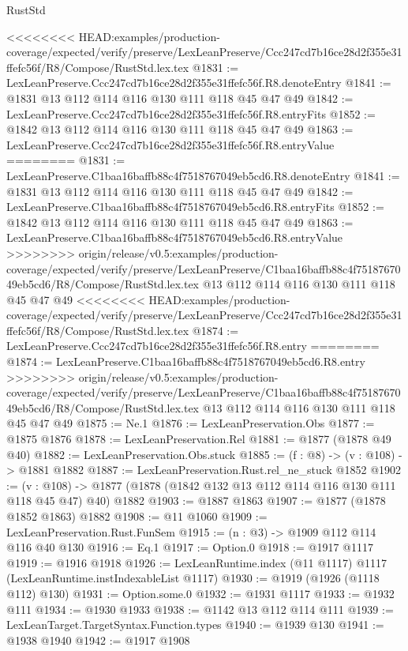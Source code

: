 \begin{lexlean}{RustStd}
\begin{coremodule}
{\begin{coremodule}
<<<<<<<< HEAD:examples/production-coverage/expected/verify/preserve/LexLeanPreserve/Ccc247cd7b16ce28d2f355e31ffefc56f/R8/Compose/RustStd.lex.tex
@1831 := LexLeanPreserve.Ccc247cd7b16ce28d2f355e31ffefc56f.R8.denoteEntry
@1841 := @1831 @13 @112 @114 @116 @130 @111 @118 @45 @47 @49
@1842 := LexLeanPreserve.Ccc247cd7b16ce28d2f355e31ffefc56f.R8.entryFits
@1852 := @1842 @13 @112 @114 @116 @130 @111 @118 @45 @47 @49
@1863 := LexLeanPreserve.Ccc247cd7b16ce28d2f355e31ffefc56f.R8.entryValue
========
@1831 := LexLeanPreserve.C1baa16baffb88c4f7518767049eb5cd6.R8.denoteEntry
@1841 := @1831 @13 @112 @114 @116 @130 @111 @118 @45 @47 @49
@1842 := LexLeanPreserve.C1baa16baffb88c4f7518767049eb5cd6.R8.entryFits
@1852 := @1842 @13 @112 @114 @116 @130 @111 @118 @45 @47 @49
@1863 := LexLeanPreserve.C1baa16baffb88c4f7518767049eb5cd6.R8.entryValue
>>>>>>>> origin/release/v0.5:examples/production-coverage/expected/verify/preserve/LexLeanPreserve/C1baa16baffb88c4f7518767049eb5cd6/R8/Compose/RustStd.lex.tex
    @13
    @112
    @114
    @116
    @130
    @111
    @118
    @45
    @47
    @49
<<<<<<<< HEAD:examples/production-coverage/expected/verify/preserve/LexLeanPreserve/Ccc247cd7b16ce28d2f355e31ffefc56f/R8/Compose/RustStd.lex.tex
@1874 := LexLeanPreserve.Ccc247cd7b16ce28d2f355e31ffefc56f.R8.entry
========
@1874 := LexLeanPreserve.C1baa16baffb88c4f7518767049eb5cd6.R8.entry
>>>>>>>> origin/release/v0.5:examples/production-coverage/expected/verify/preserve/LexLeanPreserve/C1baa16baffb88c4f7518767049eb5cd6/R8/Compose/RustStd.lex.tex
    @13
    @112
    @114
    @116
    @130
    @111
    @118
    @45
    @47
    @49
@1875 := Ne.{1}
@1876 := LexLeanPreservation.Obs
@1877 := @1875 @1876
@1878 := LexLeanPreservation.Rel
@1881 := @1877 (@1878 @49 @40)
@1882 := LexLeanPreservation.Obs.stuck
@1885 := (f : @8) -> (v : @108) -> @1881 @1882
@1887 := LexLeanPreservation.Rust.rel_ne_stuck @1852
@1902 := (v : @108) ->
  @1877 (@1878 (@1842 @132 @13 @112 @114 @116 @130 @111 @118 @45 @47) @40) @1882
@1903 := @1887 @1863
@1907 := @1877 (@1878 @1852 @1863) @1882
@1908 := @11 @1060
@1909 := LexLeanPreservation.Rust.FunSem
@1915 := (n : @3) -> @1909 @112 @114 @116 @40 @130
@1916 := Eq.{1}
@1917 := Option.{0}
@1918 := @1917 @1117
@1919 := @1916 @1918
@1926 := LexLeanRuntime.index (@11 @1117) @1117 (LexLeanRuntime.instIndexableList @1117)
@1930 := @1919 (@1926 (@1118 @112) @130)
@1931 := Option.some.{0}
@1932 := @1931 @1117
@1933 := @1932 @111
@1934 := @1930 @1933
@1938 := @1142 @13 @112 @114 @111
@1939 := LexLeanTarget.TargetSyntax.Function.types
@1940 := @1939 @130
@1941 := @1938 @1940
@1942 := @1917 @1908

\end{coremodule}}
\end{coremodule}
\end{lexlean}

